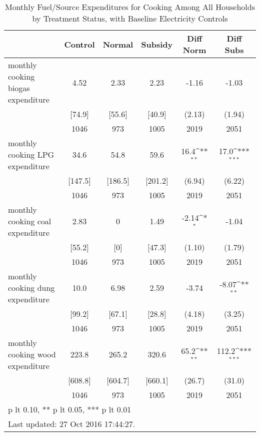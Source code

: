 \begin{table}[htbp]\centering
\def\sym#1{\ifmmode^{#1}\else\(^{#1}\)\fi}
\caption{Monthly Fuel/Source Expenditures for Cooking Among All Households by Treatment Status, with Baseline Electricity Controls \label{tab:"balance"}}
\begin{tabular*}{0.9\hsize}{@{\hskip\tabcolsep\extracolsep\fill}l*{1}{ccccc}}
\toprule
                                &  Control&   Normal&  Subsidy&Diff Norm         &Diff Subs         \\
\midrule
monthly cooking biogas expenditure&     4.52&     2.33&     2.23&    -1.16         &    -1.03         \\
                                &   [74.9]&   [55.6]&   [40.9]&   (2.13)         &   (1.94)         \\
                                &     1046&      973&     1005&     2019         &     2051         \\
monthly cooking LPG expenditure &     34.6&     54.8&     59.6&     16.4\sym{**} &     17.0\sym{***}\\
                                &  [147.5]&  [186.5]&  [201.2]&   (6.94)         &   (6.22)         \\
                                &     1046&      973&     1005&     2019         &     2051         \\
monthly cooking coal expenditure&     2.83&        0&     1.49&    -2.14\sym{*}  &    -1.04         \\
                                &   [55.2]&      [0]&   [47.3]&   (1.10)         &   (1.79)         \\
                                &     1046&      973&     1005&     2019         &     2051         \\
monthly cooking dung expenditure&     10.0&     6.98&     2.59&    -3.74         &    -8.07\sym{**} \\
                                &   [99.2]&   [67.1]&   [28.8]&   (4.18)         &   (3.25)         \\
                                &     1046&      973&     1005&     2019         &     2051         \\
monthly cooking wood expenditure&    223.8&    265.2&    320.6&     65.2\sym{**} &    112.2\sym{***}\\
                                &  [608.8]&  [604.7]&  [660.1]&   (26.7)         &   (31.0)         \\
                                &     1046&      973&     1005&     2019         &     2051         \\
\bottomrule
\multicolumn{6}{l}{\footnotesize * p lt 0.10, ** p lt 0.05, *** p lt 0.01}\\
\multicolumn{6}{l}{\footnotesize Last updated: 27 Oct 2016 17:44:27.}\\
\end{tabular*}
\end{table}
